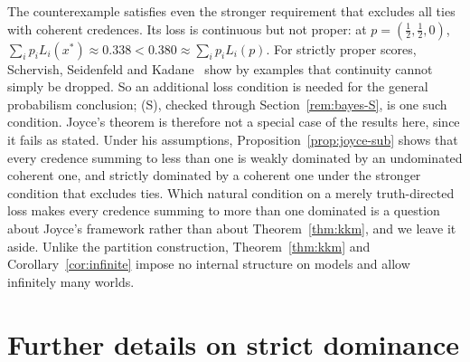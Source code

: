 \documentclass[11pt]{article}
\theoremstyle{definition}
\theoremstyle{remark}
\begin{document}
The counterexample satisfies even the stronger requirement that excludes all ties with coherent credences. Its loss is continuous but not proper: at $p=(\tfrac12,\tfrac12,0)$, $\sum_ip_iL_i(x^*)\approx0.338<0.380\approx\sum_ip_iL_i(p)$. For strictly proper scores, Schervish, Seidenfeld and Kadane~\cite{SSK09} show by examples that continuity cannot simply be dropped. So an additional loss condition is needed for the general probabilism conclusion; (S), checked through Section~\ref{rem:bayes-S}, is one such condition. Joyce's theorem is therefore not a special case of the results here, since it fails as stated. Under his assumptions, Proposition~\ref{prop:joyce-sub} shows that every credence summing to less than one is weakly dominated by an undominated coherent one, and strictly dominated by a coherent one under the stronger condition that excludes ties. Which natural condition on a merely truth-directed loss makes every credence summing to more than one dominated is a question about Joyce's framework rather than about Theorem~\ref{thm:kkm}, and we leave it aside. Unlike the partition construction, Theorem~\ref{thm:kkm} and Corollary~\ref{cor:infinite} impose no internal structure on models and allow infinitely many worlds.

\section{Further details on strict dominance}\label{sec:strictproof}
\end{document}
